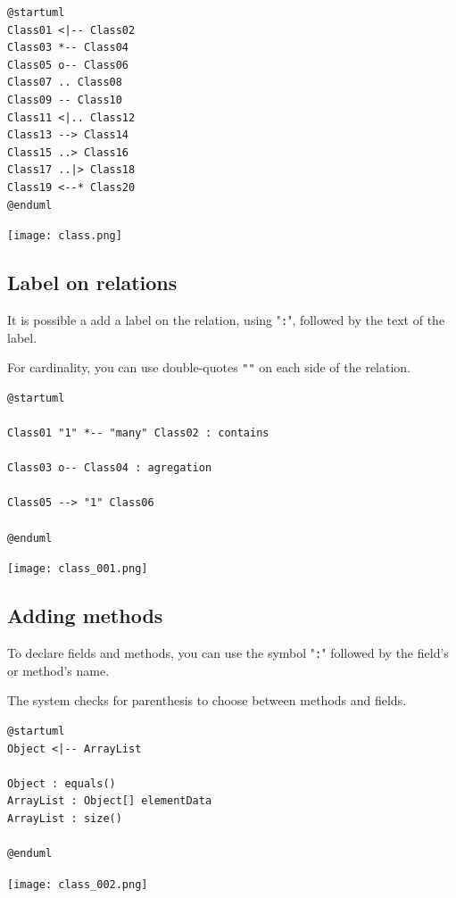 \begin{lstlisting}
@startuml
Class01 <|-- Class02
Class03 *-- Class04
Class05 o-- Class06
Class07 .. Class08
Class09 -- Class10
Class11 <|.. Class12
Class13 --> Class14
Class15 ..> Class16
Class17 ..|> Class18
Class19 <--* Class20
@enduml
\end{lstlisting}
\begin{center}
\texttt{[image: class.png]}
\end{center}

\newpage \subsection{Label on relations}

\begin{description}
\item It is possible a add a label on the relation, using "\texttt{:}", followed
by the text of the label.
\item For cardinality, you can use double-quotes \texttt{""} on each side
of the relation.
\end{description}

\begin{lstlisting}
@startuml

Class01 "1" *-- "many" Class02 : contains

Class03 o-- Class04 : agregation

Class05 --> "1" Class06

@enduml
\end{lstlisting}
\begin{center}
\texttt{[image: class\_001.png]}
\end{center}


\newpage \subsection{Adding methods}

\begin{description}
\item To declare fields and methods, you can use the symbol "\texttt{:}"
followed by the field's or method's name.
\item The system checks for parenthesis to choose between methods and fields.
\end{description}

\begin{lstlisting}
@startuml
Object <|-- ArrayList

Object : equals()
ArrayList : Object[] elementData
ArrayList : size()

@enduml
\end{lstlisting}
\begin{center}
\texttt{[image: class\_002.png]}
\end{center}

